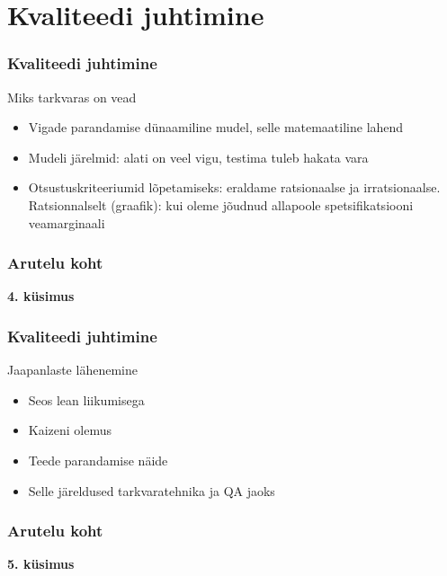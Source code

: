 \section{Kvaliteedi juhtimine}

\begin{frame}[fragile]
  \frametitle{Kvaliteedi juhtimine}
	Miks tarkvaras on vead
	\begin{itemize}
		\item Vigade parandamise dünaamiline mudel, selle matemaatiline lahend
		\item Mudeli järelmid: alati on veel vigu, testima tuleb hakata vara
		\item Otsustuskriteeriumid lõpetamiseks: eraldame ratsionaalse ja irratsionaalse. Ratsionnalselt (graafik): kui oleme jõudnud allapoole spetsifikatsiooni veamarginaali
	\end{itemize}
\end{frame}

\begin{frame}[fragile]
  \frametitle{Arutelu koht}
		\begin{center}
			\textbf{4. küsimus}
		\end{center}
\end{frame}

\begin{frame}[fragile]
  \frametitle{Kvaliteedi juhtimine}
	Jaapanlaste lähenemine
	\begin{itemize}
		\item Seos lean liikumisega
		\item Kaizeni olemus
		\item Teede parandamise näide
		\item Selle järeldused tarkvaratehnika ja QA jaoks
	\end{itemize}
\end{frame}

\begin{frame}[fragile]
  \frametitle{Arutelu koht}
		\begin{center}
			\textbf{5. küsimus}
		\end{center}
\end{frame}


